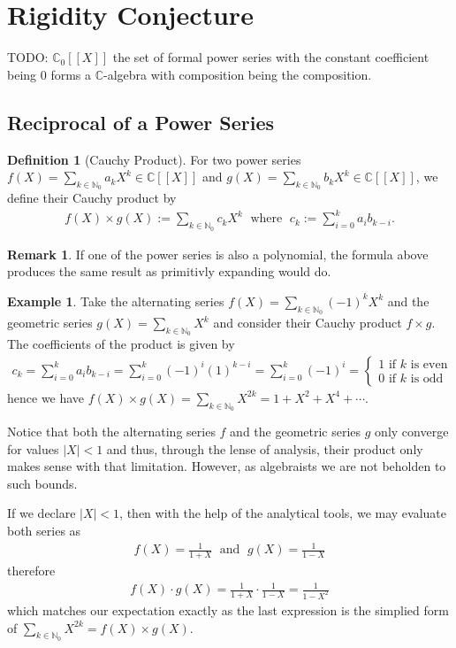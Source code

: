\documentclass[a4paper]{article}
\theoremstyle{definition}
\newtheorem{definition}{Definition}[]
\newtheorem{example}{Example}[definition]
\newtheorem*{remark}{Remark}
\begin{document}
\section{Rigidity Conjecture}

TODO: \(\mathbb{C}_0[[X]]\) the set of formal power series with the constant coefficient being \(0\) forms a \(\mathbb{C}\)-algebra with composition being the composition.
%
\subsection{Reciprocal of a Power Series}
\begin{definition}[Cauchy Product]
    For two power series \(f(X) = \sum_{k \in \mathbb{N}_0} a_k X^k \in \mathbb{C}[[X]]\) and \(g(X) = \sum_{k \in \mathbb{N}_0} b_k X^k \in \mathbb{C}[[X]]\), we define their Cauchy product by
    \begin{align*}
        f(X) \times g(X) := \sum_{k \in \mathbb{N}_0} c_k X^k \; \text{ where } \; c_k := \sum_{i = 0}^{k}a_i b_{k - i} \text{.}
    \end{align*}
\end{definition}
%
\begin{remark}
    If one of the power series is also a polynomial, the formula above produces the same result as primitivly expanding would do.
\end{remark}
%
\begin{example}
    Take the alternating series \(f(X) = \sum_{k \in \mathbb{N}_0} (-1)^k X^k\) and the geometric series \(g(X) = \sum_{k \in \mathbb{N}_0} X^k\) and consider their Cauchy product \(f \times g\). The coefficients of the product is given by
    \begin{align*}
        c_k = \sum_{i=0}^k a_i b_{k-i} = \sum_{i=0}^k (-1)^{i} (1)^{k-i} = \sum_{i=0}^{k} (-1)^{i} = \begin{cases}
            1 \text{ if \(k\) is even} \\
            0 \text{ if \(k\) is odd}
        \end{cases}
    \end{align*}
    hence we have \(f(X) \times g(X) = \sum_{k \in \mathbb{N}_0} X^{2k} = 1 + X^2 + X^4 + \cdots\).

    Notice that both the alternating series \(f\) and the geometric series \(g\) only converge for values \(|X| < 1\) and thus, through the lense of analysis, their product only makes sense with that limitation. However, as algebraists we are not beholden to such bounds.

    If we declare \(|X| < 1\), then with the help of the analytical tools, we may evaluate both series as
    \begin{align*}
        f(X) = \frac{1}{1 + X} \; \text{ and } \; g(X) = \frac{1}{1 - X}
    \end{align*}
    therefore
    \begin{align*}
        f(X) \cdot g(X) = \frac{1}{1 + X} \cdot \frac{1}{1 - X} = \frac{1}{1 - X^2}
    \end{align*}
    which matches our expectation exactly as the last expression is the simplied form of \(\sum_{k \in \mathbb{N}_0} X^{2k} = f(X) \times g(X)\).
\end{example}
\end{document}
